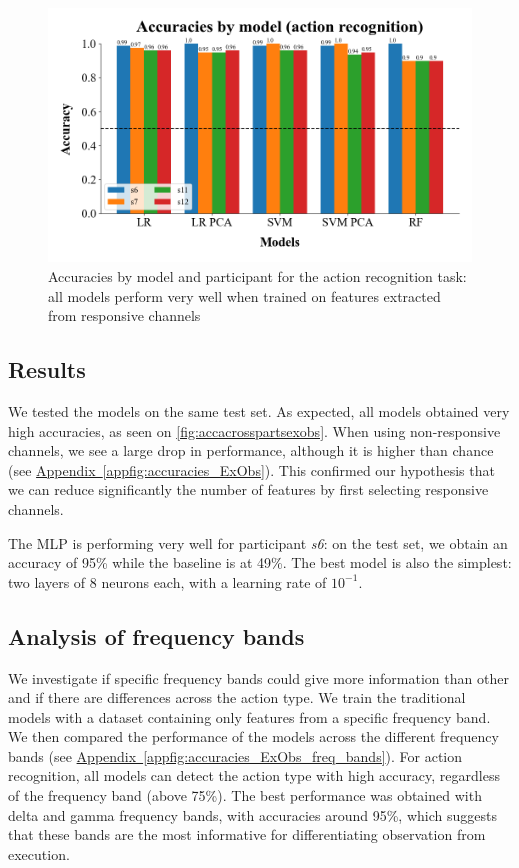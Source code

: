 \documentclass[10pt,conference,compsocconf]{IEEEtran}
\newcommand{\aref}[1]{\hyperref[#1]{Appendix~\ref*{#1}}}
\begin{document}
\begin{figure}[h!]
    \center
    \includegraphics[width=\linewidth]{../Code/figures/accuracies_across_part_ExObs.png}
    \caption{Accuracies by model and participant for the action recognition task: all models perform very well when trained on features extracted from responsive channels}
    \label{fig:accacrosspartsexobs}
 \end{figure}
\FloatBarrier

\subsection{Results}
We tested the models on the same test set. As expected, all models obtained very high accuracies, as seen on \autoref{fig:accacrosspartsexobs}. When using non-responsive channels, we see a large drop in performance, although it is higher than chance (see \aref{appfig:accuracies_ExObs}). This confirmed our hypothesis that we can reduce significantly the number of features by first selecting responsive channels.

The MLP is performing very well for participant \textit{s6}: on the test set, we obtain an accuracy of 95\% while the baseline is at 49\%. The best model is also the simplest: two layers of 8 neurons each, with a learning rate of \(10^{-1}\).

\subsection{Analysis of frequency bands}
We investigate if specific frequency bands could give more information than other and if there are differences across the action type. We train the traditional models with a dataset containing only features from a specific frequency band. We then compared the performance of the models across the different frequency bands (see \aref{appfig:accuracies_ExObs_freq_bands}). For action recognition, all models can detect the action type with high accuracy, regardless of the frequency band (above 75\%). The best performance was obtained with delta and gamma frequency bands, with accuracies around 95\%, which suggests that these bands are the most informative for differentiating observation from execution.
\end{document}
